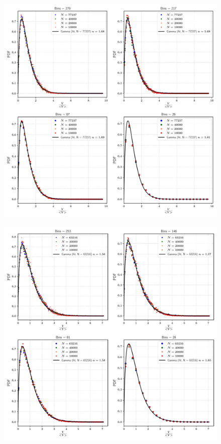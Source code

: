 \begin{figure}
\centering
\includegraphics{plots/drop_stats/short_time_volume_bins.pdf}
	\caption{\blindtext}
\label{t1_vol_bins}
\end{figure}





\begin{figure}
\centering
\includegraphics{plots/drop_stats/long_time_volume_bins.pdf}
	\caption{\blindtext}
\label{t2_vol_bins}
\end{figure}


